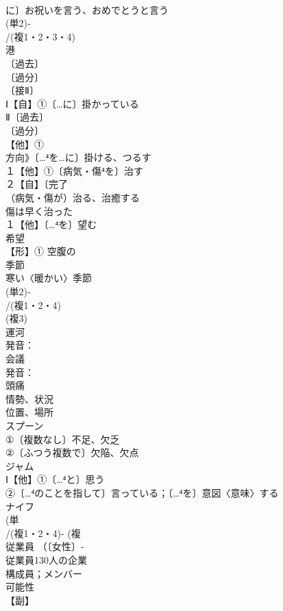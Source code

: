 \documentclass[8pt]{extreport}
\begin{document}
\begin{CJK}{UTF8}{min}
\\	に〕お祝いを言う、おめでとうと言う 
\\	(単2)‐
\\	/(複1・2・3・4)
\\	港 
\\	〔過去〕
\\	〔過分〕
\\	〔接Ⅱ〕
\\	Ⅰ【自】①〔…に〕掛かっている 
\\	Ⅱ〔過去〕
\\	〔過分〕
\\	【他】①
\\	方向》〔…⁴を…に〕掛ける、つるす 
\\	１【他】①〔病気・傷⁴を〕治す 
\\	２【自】〔完了
\\	（病気・傷が）治る、治癒する 
\\	傷は早く治った 
\\	１【他】〔…⁴を〕望む 
\\	希望 
\\	【形】① 空腹の 
\\	季節 
\\	寒い〈暖かい〉季節
\\	(単2)‐
\\	/(複1・2・4)
\\	(複3)
\\	運河 
\\	発音：
\\	会議 
\\	発音：
\\	頭痛 
\\	情勢、状況 
\\	位置、場所
\\	スプーン 
\\	①〔複数なし〕不足、欠乏 
\\	②〔ふつう複数で〕欠陥、欠点
\\	ジャム 
\\	Ⅰ【他】①〔…⁴と〕思う 
\\	②〔…⁴のことを指して〕言っている；〔…⁴を〕意図〈意味〉する
\\	ナイフ 
\\	(単
\\	/(複1・2・4)- (複
\\	従業員 （〔女性〕‐
\\	従業員130人の企業 
\\	構成員；メンバー 
\\	可能性 
\\	【副】

\end{CJK}
\end{document}
